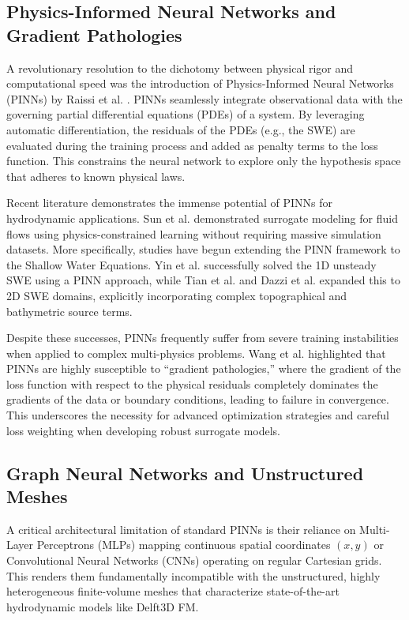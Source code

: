 \subsection{Physics-Informed Neural Networks and Gradient Pathologies}

A revolutionary resolution to the dichotomy between physical rigor and computational speed was the introduction of Physics-Informed Neural Networks (PINNs) by Raissi et al. \cite{Raissi2019}. PINNs seamlessly integrate observational data with the governing partial differential equations (PDEs) of a system. By leveraging automatic differentiation, the residuals of the PDEs (e.g., the SWE) are evaluated during the training process and added as penalty terms to the loss function. This constrains the neural network to explore only the hypothesis space that adheres to known physical laws.

Recent literature demonstrates the immense potential of PINNs for hydrodynamic applications. Sun et al. \cite{Sun2020} demonstrated surrogate modeling for fluid flows using physics-constrained learning without requiring massive simulation datasets. More specifically, studies have begun extending the PINN framework to the Shallow Water Equations. Yin et al. \cite{Yin2024} successfully solved the 1D unsteady SWE using a PINN approach, while Tian et al. \cite{Tian2025} and Dazzi et al. \cite{Dazzi2024} expanded this to 2D SWE domains, explicitly incorporating complex topographical and bathymetric source terms. 

Despite these successes, PINNs frequently suffer from severe training instabilities when applied to complex multi-physics problems. Wang et al. \cite{Wang2021} highlighted that PINNs are highly susceptible to ``gradient pathologies,'' where the gradient of the loss function with respect to the physical residuals completely dominates the gradients of the data or boundary conditions, leading to failure in convergence. This underscores the necessity for advanced optimization strategies and careful loss weighting when developing robust surrogate models.

\subsection{Graph Neural Networks and Unstructured Meshes}

A critical architectural limitation of standard PINNs is their reliance on Multi-Layer Perceptrons (MLPs) mapping continuous spatial coordinates $(x, y)$ or Convolutional Neural Networks (CNNs) operating on regular Cartesian grids. This renders them fundamentally incompatible with the unstructured, highly heterogeneous finite-volume meshes that characterize state-of-the-art hydrodynamic models like Delft3D FM. 

